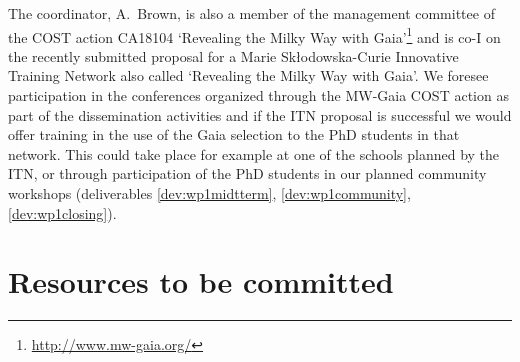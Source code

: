 The coordinator, A.~Brown, is also a member of the management committee of the COST action CA18104 `Revealing the Milky Way with Gaia'\footnote{\url{http://www.mw-gaia.org/}} and is co-I on the recently submitted proposal for a Marie Sk\l{}odowska-Curie Innovative Training Network also called `Revealing the Milky Way with Gaia'. We foresee participation in the conferences organized through the MW-Gaia COST action as part of the dissemination activities and if the ITN proposal is successful we would offer training in the use of the Gaia selection to the PhD students in that network. This could take place for example at one of the schools planned by the ITN, or through participation of the PhD students in our planned community workshops (deliverables \ref{dev:wp1midtterm}, \ref{dev:wp1community}, \ref{dev:wp1closing}).

\section{Resources to be committed}
\label{sec:resources}

\makesummaryofefforttable


\makecoststable

